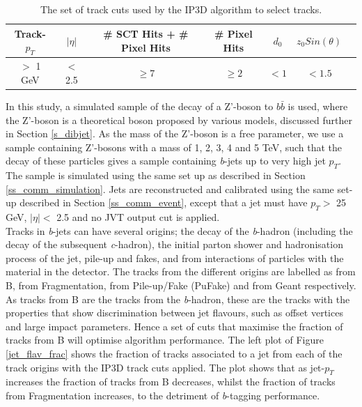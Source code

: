 \documentclass[12pt, onecolumn,notitlepage]{article}
\begin{document}
\begin{table}[!htb]
  
  \vspace{-0.2cm}
  \begin{center}
    \begin{tabular}{ | c | c | c | c | c | c | c  }
      \hline
      Track-$p_T$ & $|\eta|$  & \# SCT Hits + \# Pixel Hits &  \# Pixel Hits & $d_0$ & $z_0 Sin(\theta)$\\
      \hline
      $>$ 1 GeV  & $<$ 2.5  & $\geq 7$ & $\geq 2$ & $< 1$ & $< 1.5$\\
     
      \hline
    \end{tabular}
    \caption{The set of track cuts used by the IP3D algorithm to select tracks.}
    \label{track_cuts}
    \vspace{-0.6cm}

  \end{center}
\end{table}

In this study, a simulated sample of the decay of a Z'-boson to $b\bar{b}$ is used,
where the Z'-boson is a theoretical boson proposed by various models, discussed further in Section \ref{s_dibjet}.
As the mass of the Z'-boson is a free parameter, we use a 
sample containing Z'-bosons with a mass of 
1, 2, 3, 4 and 5 TeV, such that the decay of these particles gives a sample containing \textit{b}-jets up to very high jet $p_T$. 
The sample is simulated using the same set up as described in Section \ref{ss_comm_simulation}.
Jets are reconstructed and calibrated using the same set-up described in Section \ref{ss_comm_event},
except that a jet must have $p_{T} > $ 25 GeV, $|\eta| <$ 2.5 and no JVT output cut is applied. \\

Tracks in \textit{b}-jets can have several origins;
the decay of the \textit{b}-hadron (including the decay of the subsequent \textit{c}-hadron),
the initial parton shower and hadronisation process of the jet, pile-up and fakes, and from interactions of particles with the material in the detector.
The tracks from the different origins are labelled as from B, from Fragmentation, from Pile-up/Fake (PuFake) and from Geant respectively.
As tracks from B are the tracks from the \textit{b}-hadron, these are the tracks with the properties that show discrimination between jet flavours, 
such as offset vertices and large impact parameters. 
Hence a set of cuts that maximise the fraction of tracks from B will optimise algorithm performance.
The left plot of Figure \ref{jet_flav_frac} shows the fraction of tracks associated to a jet from each of the track origins with the IP3D track cuts applied.
The plot shows that as jet-$p_T$ increases the fraction of tracks from B decreases, whilst the fraction of tracks from Fragmentation increases,
to the detriment of \textit{b}-tagging performance. \\
\end{document}
